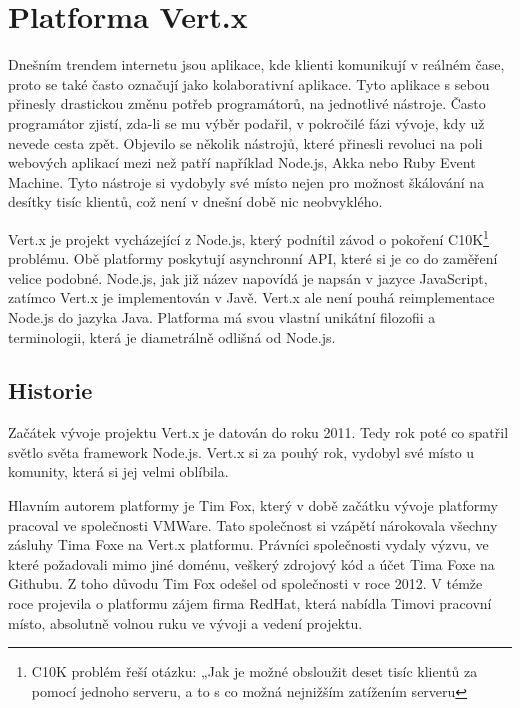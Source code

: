 
\chapter{Platforma Vert.x}

Dnešním trendem internetu jsou aplikace, kde klienti komunikují v reálném čase, proto se také často označují jako kolaborativní aplikace. Tyto aplikace s sebou přinesly drastickou změnu potřeb programátorů, na jednotlivé nástroje. Často programátor zjistí, zda-li se mu výběr podařil, v pokročilé fázi vývoje, kdy už nevede cesta zpět. Objevilo se několik nástrojů, které přinesli revoluci na poli webových aplikací mezi než patří například Node.js, Akka nebo Ruby Event Machine. 
Tyto nástroje si vydobyly své místo nejen pro možnost škálování na desítky tisíc klientů, což není v dnešní době nic neobvyklého. 

Vert.x je projekt vycházející z Node.js, který podnítil závod o pokoření C10K\footnote{C10K problém řeší otázku: „Jak je možné obsloužit deset tisíc klientů za pomocí jednoho serveru, a to s co možná nejnižším zatížením serveru} problému. Obě platformy poskytují asynchronní API, které si je co do zaměření velice podobné. Node.js, jak již název napovídá je napsán v jazyce JavaScript, zatímco Vert.x je implementován v Javě. Vert.x ale není pouhá reimplementace Node.js do jazyka Java. Platforma má svou vlastní unikátní filozofii a terminologii, která je diametrálně odlišná od Node.js.

\section{Historie}

Začátek vývoje projektu Vert.x je datován do roku 2011. Tedy rok poté co spatřil světlo světa framework Node.js. Vert.x si za pouhý rok, vydobyl své místo u komunity, která si jej velmi oblíbila. 

Hlavním autorem platformy je Tim Fox, který v době začátku vývoje platformy pracoval ve společnosti VMWare. Tato společnost si vzápětí nárokovala všechny zásluhy Tima Foxe na Vert.x platformu. Právníci společnosti vydaly výzvu, ve které požadovali mimo jiné doménu, veškerý zdrojový kód a účet Tima Foxe na Githubu. Z toho důvodu Tim Fox odešel od společnosti v roce 2012. V témže roce projevila o platformu zájem firma RedHat, která nabídla Timovi pracovní místo, absolutně volnou ruku ve vývoji a vedení projektu\citep{whoControlVertx}. 


